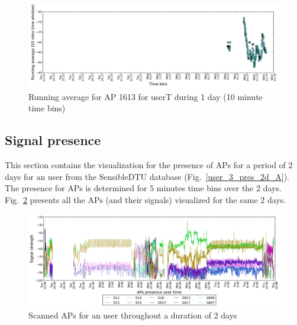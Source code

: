 \begin{figure}[!h]
\centering
\includegraphics[width
=\textwidth]{figures/rn_avg/user_1_sorted_1days_plot_1613_rn_avg_sig_10.png}
\caption{Running average for AP 1613 for userT during 1 day (10 minute time
bins)}
\label{user_1_AP1613_rn10avg_1d_A}
\end{figure}

\subsection{Signal presence}
\label{appendix_pres}
This section contains the visualization for the presence of APs for a period of
$2$ days for an user from the SensibleDTU database
(Fig.~\ref{user_3_pres_2d_A}). The presence for APs is determined for $5$
minutes time bins over the $2$ days. Fig.~\ref{user_3_APs_2d_A} presents all the
APs (and their signals) visualized for the same $2$ days.

\begin{figure}[!h]
\centering
\includegraphics[width
=\textwidth]{figures/presence/user_3_sorted_2days_plot.png}
\caption{Scanned APs for an user throughout a duration of 2 days}
\label{user_3_APs_2d_A}
\end{figure}


